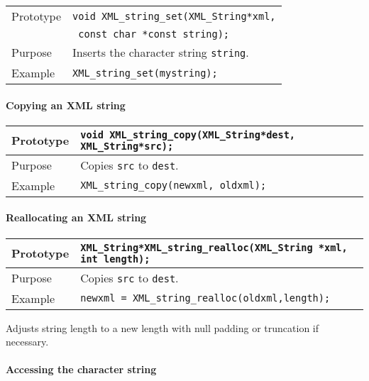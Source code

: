 \documentclass{article}
\newcommand{\QMDhandle}{{\tt XML\_String}}
\begin{document}
\begin{flushleft}
  \begin{tabular}{|l|l|}
  \hline
  Prototype      & \verb|void XML_string_set(|\QMDhandle \verb|*xml,| \\
                 & \verb| const char *const string);|\\
    \hline
  Purpose        & Inserts the character string \verb|string|. \\
   \hline
  Example        & \verb|XML_string_set(mystring);| \\
   \hline
 \end{tabular}
\end{flushleft}
%
\paragraph{Copying an XML string}

\begin{flushleft}
  \begin{tabular}{|l|l|}
  \hline
  Prototype      & \verb|void XML_string_copy(|\QMDhandle \verb|*dest, |\QMDhandle \verb|*src);|\\
    \hline
  Purpose        & Copies \verb|src| to \verb|dest|. \\
   \hline
  Example        & \verb|XML_string_copy(newxml, oldxml);| \\
   \hline
 \end{tabular}
\end{flushleft}
%
\paragraph{Reallocating an XML string}

\begin{flushleft}
  \begin{tabular}{|l|l|}
  \hline
  Prototype      & \QMDhandle \verb|*XML_string_realloc(|\QMDhandle \verb| *xml, int length);|\\
    \hline
  Purpose        & Copies \verb|src| to \verb|dest|. \\
   \hline
  Example        & \verb|newxml = XML_string_realloc(oldxml,length);| \\
   \hline
 \end{tabular}
\end{flushleft}
Adjusts string length to a new length with null padding or truncation
if necessary.
%
\paragraph{Accessing the character string}
\end{document}
